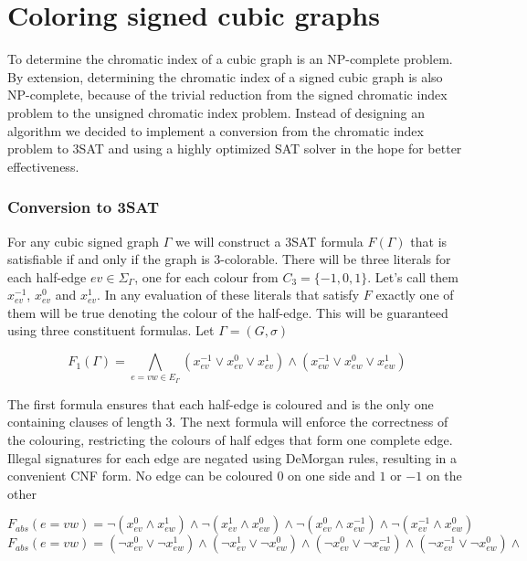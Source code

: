 \chapter{Coloring signed cubic graphs}

To determine the chromatic index of a cubic graph is an NP-complete problem. By extension, determining the chromatic index of a signed cubic graph is also NP-complete, because of the trivial reduction from the signed chromatic index problem to the unsigned chromatic index problem. Instead of designing an algorithm we decided to implement a conversion from the chromatic index problem to 3SAT and using a highly optimized SAT solver in the hope for better effectiveness.

\subsection{Conversion to 3SAT}

For any cubic signed graph $\Gamma$ we will construct a 3SAT formula $F(\Gamma)$ that is satisfiable if and only if the graph is 3-colorable. There will be three literals for each half-edge $ev \in \Sigma _{\Gamma}$, one for each colour from $C_3 = \{-1, 0, 1\}$. Let's call them $x^{-1}_{ev}$, $x^{0}_{ev}$ and $x^{1}_{ev}$. In any evaluation of these literals that satisfy $F$ exactly one of them will be true denoting the colour of the half-edge. This will be guaranteed using three constituent formulas. Let $\Gamma = (G, \sigma)$

$$F_1 (\Gamma) = \bigwedge _{e = vw \in E_{\Gamma}} (x^{-1}_{ev} \vee x^{0}_{ev} \vee x^{1}_{ev}) \wedge (x^{-1}_{ew} \vee x^{0}_{ew} \vee x^{1}_{ew}) $$

The first formula ensures that each half-edge is coloured and is the only one containing clauses of length 3. The next formula will enforce the correctness of the colouring, restricting the colours of half edges that form one complete edge. Illegal signatures for each edge are negated using DeMorgan rules, resulting in a convenient CNF form. No edge can be coloured $0$ on one side and $1$ or $-1$ on the other

$$F_{abs} (e = vw) = \neg (x^{0}_{ev} \land x^{1}_{ew}) \land \neg (x^{1}_{ev} \land x^{0}_{ew}) \land \neg (x^{0}_{ev} \land x^{-1}_{ew}) \land \neg (x^{-1}_{ev} \land x^{0}_{ew})$$
$$F_{abs} (e = vw) = (\neg x^{0}_{ev} \lor \neg x^{1}_{ew}) \land (\neg x^{1}_{ev} \lor \neg x^{0}_{ew}) \land (\neg x^{0}_{ev} \lor \neg x^{-1}_{ew}) \land (\neg x^{-1}_{ev} \lor \neg x^{0}_{ew}) \land $$

